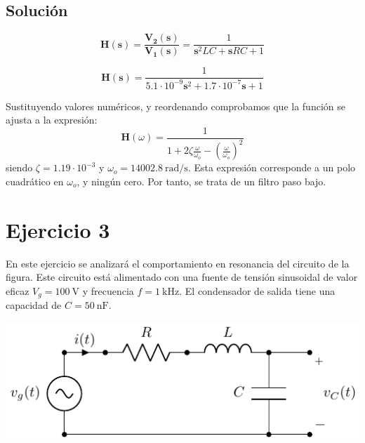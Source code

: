 \documentclass[12pt]{article}
\newcommand{\laplace}[1]{\mathbf{#1}(\mathbf{s})}
\newcommand{\slp}{\mathbf{s}}
\begin{document}
\subsection*{Solución}

    \[
      \laplace{H} = \frac{\laplace{V_2}}{\laplace{V_1}} = \frac{1}{\slp^2 LC + \slp RC + 1}
    \]

    \[
      \laplace{H} = \frac{1}{5.1\cdot10^{-9} \slp^2 + 1.7\cdot10^{-7} \slp + 1}
    \]

    Sustituyendo valores numéricos, y reordenando comprobamos que la función se ajusta a la expresión:
      \[
        \mathbf{H}(\omega) = \frac{1}{1 + 2\zeta \frac{\omega}{\omega_o} - (\frac{\omega}{\omega_o})^2}
      \]
      siendo $\zeta = 1.19\cdot10^{-3}$ y $\omega_o= \SI{14002.8}{\radian\per\second}$.
      Esta expresión corresponde a un polo cuadrático en $\omega_o$, y ningún cero. Por tanto, se trata de un filtro paso bajo.

\clearpage

\section*{Ejercicio 3}

En este ejercicio se analizará el comportamiento en resonancia del circuito de la figura. Este circuito está alimentado con una fuente de tensión sinusoidal de valor eficaz $V_g = \SI{100}{\volt}$ y frecuencia $f = \SI{1}{\kilo\hertz}$. El condensador de salida tiene una capacidad de $C = \SI{50}{\nano\farad}$.

\begin{center}
  \includegraphics{figs/circuito_resonancia.pdf}
\end{center}
\end{document}
